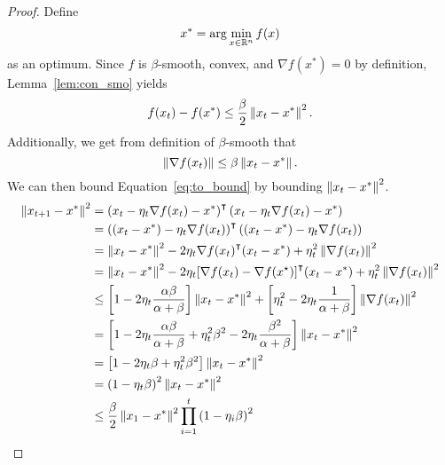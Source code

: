 \begin{proof}
    Define
    \begin{equation}
        x^* = \arg \min_{x \in \mathbb R^n} f(x)
    \end{equation} as an optimum.
    Since $f$ is $\beta$-smooth, convex, and
    $\nabla f(x^*) = 0$ by definition, Lemma~\ref{lem:con_smo} yields
    \begin{equation}
        \label{eq:to_bound}
        f(x_t) - f(x^*) \leq \frac{\beta}{2} \left\| x_t - x^* \right\|^2.
    \end{equation}
    Additionally, we get from definition of $\beta$-smooth that 
    \begin{equation}
        \left\| \nabla f(x_t) \right\| \leq \beta \left\| x_t - x^* \right\|.
    \end{equation}
    We can then bound Equation~\ref{eq:to_bound} by bounding $\left\| x_t - x^* \right\|^2$.
    \begin{equation}
        \begin{aligned}
            \left\| x_{t + 1} - x^* \right\|^2 &= {\left( x_{t} - \eta_t \nabla f(x_t) - x^*
            \right)}^\intercal \left( x_{t} - \eta_t \nabla f(x_t) - x^* \right)
            \\
            &= {\left( (x_{t} - x^*) - \eta_t \nabla f(x_t) 
            \right)}^\intercal \left( (x_{t}-x^*) - \eta_t \nabla f(x_t) \right)
            \\
            &= \left\| x_t - x^* \right\|^2 - 2\eta_t {\nabla
            f(x_t)}^\intercal (x_t - x^*) + \eta_t^2 \left\| \nabla f(x_t) \right\|^2 \\
            &= \left\| x_t - x^* \right\|^2 - 2\eta_t {[\nabla
            f(x_t) - \nabla f(x^\star)]}^\intercal (x_t - x^*) + \eta_t^2
            \left\| \nabla f(x_t) \right\|^2 \\
            &\leq \left[ 1 - 2\eta_t \frac{\alpha \beta}{\alpha + \beta}
            \right]\left\| x_t - x^* \right\|^2 + \left[  \eta_t^2  - 2\eta_t\frac{1}{\alpha +
            \beta} \right]\left\| \nabla f(x_t) \right\|^2\\
            &= \left[ 1 - 2\eta_t \frac{\alpha \beta}{\alpha + \beta}
              + \eta_t^2\beta^2  - 2\eta_t\frac{\beta^2}{\alpha +
            \beta} \right]\left\| x_t - x^* \right\|^2 \\
            &= \left[ 1 - 2\eta_t \beta 
              + \eta_t^2\beta^2  \right]\left\| x_t - x^* \right\|^2 \\
            &= {\left( 1 -  \eta_t\beta  \right)}^2\left\| x_t - x^* \right\|^2 \\
            &\leq \frac{\beta}{2} \left\| x_1 - x^* \right\|^2\prod_{i = 1}^t {\left( 1 - \eta_i \beta
        \right)}^{2} 
        \end{aligned}
    \end{equation}
\end{proof}

